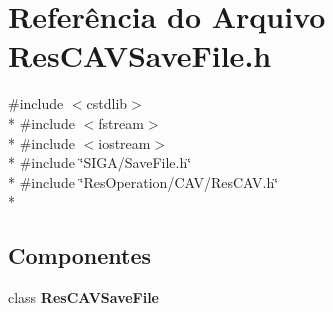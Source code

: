 \section{Referência do Arquivo Res\+C\+A\+V\+Save\+File.\+h}
\label{_c_a_v_2_res_c_a_v_save_file_8h}
{\ttfamily \#include $<$cstdlib$>$}\\*
{\ttfamily \#include $<$fstream$>$}\\*
{\ttfamily \#include $<$iostream$>$}\\*
{\ttfamily \#include \char`\"{}S\+I\+G\+A/\+Save\+File.\+h\char`\"{}}\\*
{\ttfamily \#include \char`\"{}Res\+Operation/\+C\+A\+V/\+Res\+C\+A\+V.\+h\char`\"{}}\\*
\subsection*{Componentes}
\begin{DoxyCompactItemize}
\item 
class {\bf Res\+C\+A\+V\+Save\+File}
\end{DoxyCompactItemize}
